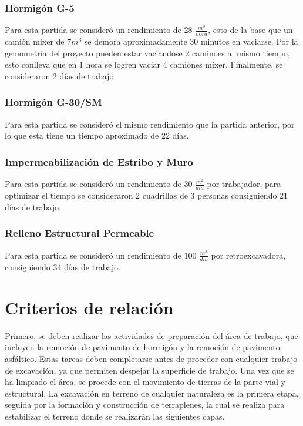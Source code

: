 \documentclass{article} %
\begin{document}
\subsubsection{Hormigón G-5}
Para esta partida se consideró un rendimiento de 28 $\frac{m^3}{hora}$, esto de la base que un camión mixer de $7m^3$ se demora aproximadamente 30 minutos en vaciarse. Por la gemometría del proyecto pueden estar vaciandose 2 caminoes al mismo tiempo, esto conlleva que en 1 hora se logren vaciar 4 camiones mixer. Finalmente, se consideraron 2 días de trabajo.

\subsubsection{Hormigón G-30/SM}
Para esta partida se consideró el mismo rendimiento que la partida anterior, por lo que esta tiene un tiempo aproximado de 22 días.

\subsubsection{Impermeabilización de Estribo y Muro}
Para esta partida se consideró un rendimiento de 30 $\frac{m^2}{dia}$ por trabajador, para optimizar el tiempo se consideraron 2 cuadrillas de 3 personas consiguiendo 21 días de trabajo.

\subsubsection{Relleno Estructural Permeable}
Para esta partida se consideró un rendimiento de 100 $\frac{m^3}{dia}$ por retroexcavadora, consiguiendo 34 días de trabajo.



\newpage
\section{Criterios de relación}

Primero, se deben realizar las actividades de preparación del área de trabajo, que incluyen la remoción de pavimento de hormigón y la remoción de pavimento asfáltico. Estas tareas deben completarse antes de proceder con cualquier trabajo de excavación, ya que permiten despejar la superficie de trabajo. Una vez que se ha limpiado el área, se procede con el movimiento de tierras de la parte vial y estructural. La excavación en terreno de cualquier naturaleza es la primera etapa, seguida por la formación y construcción de terraplenes, la cual se realiza para estabilizar el terreno donde se realizarán las siguientes capas.
\end{document}
